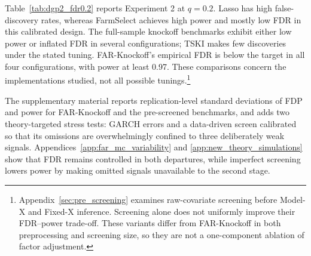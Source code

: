 ﻿\documentclass[12pt]{article}
\newcommand{\0}{\mbox{\bf 0}}
\theoremstyle{plain}%
\theoremstyle{definition}
\begin{document}
{%
\begin{table}[htbp]
\caption{Parameters calibrated for Experiment 2}
\label{tab:calibrationDGP2}\centering
{}
\end{table}


{\color{minorrevisionred}
Table~\ref{tab:dgp2_fdr0.2} reports Experiment 2 at $q=0.2$. Lasso has high false-discovery rates, whereas FarmSelect achieves high power and mostly low FDR in this calibrated design. The full-sample knockoff benchmarks exhibit either low power or inflated FDR in several configurations; TSKI makes few discoveries under the stated tuning. FAR-Knockoff's empirical FDR is below the target in all four configurations, with power at least 0.97. These comparisons concern the implementations studied, not all possible tunings.\footnote{Appendix~\ref{sec:pre_screening} examines raw-covariate screening before Model-X and Fixed-X inference. Screening alone does not uniformly improve their FDR--power trade-off. These variants differ from FAR-Knockoff in both preprocessing and screening size, so they are not a one-component ablation of factor adjustment.}
}

{\color{minorrevisionred}The supplementary material reports replication-level
standard deviations of FDP and power for FAR-Knockoff and the pre-screened
benchmarks, and adds two theory-targeted stress tests:
GARCH errors and a data-driven screen calibrated so that its omissions are
overwhelmingly confined to three deliberately weak signals.
Appendices~\ref{app:far_mc_variability} and
\ref{app:new_theory_simulations} show that FDR remains controlled in both
departures, while imperfect screening lowers power by making omitted signals
unavailable to the second stage.}


}
\end{document}
